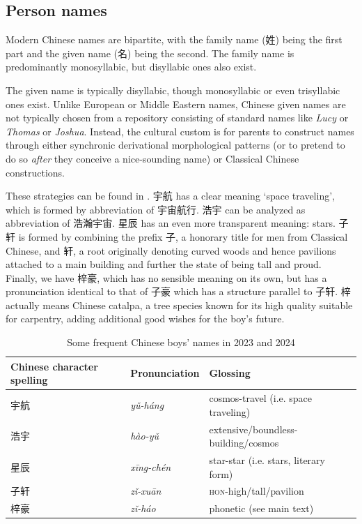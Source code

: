 \documentclass[UTF8, a4paper, oneside, scheme=plain, 12pt]{ctexrep}
\newcommand{\form}[1]{\emph{#1}}
\newcommand{\translate}[1]{`#1'}
\newcommand*{\category}[1]{\textsc{#1}}
\begin{document}
\subsection{Person names}

Modern Chinese names are bipartite, with the family name (姓) being the first part
and the given name (名) being the second.
The family name is predominantly monosyllabic,
but disyllabic ones also exist.

The given name is typically disyllabic,
though monosyllabic or even trisyllabic ones exist.
Unlike European or Middle Eastern names,
Chinese given names are not typically chosen from a repository consisting of standard names
like \form{Lucy} or \form{Thomas} or \form{Joshua}.
Instead, the cultural custom is for parents to construct names through
either synchronic derivational morphological patterns
(or to pretend to do so \emph{after} they conceive a nice-sounding name)
or Classical Chinese constructions.

These strategies can be found in .
宇航 has a clear meaning \translate{space traveling},
which is formed by abbreviation of 宇宙航行.
浩宇 can be analyzed as abbreviation of 浩瀚宇宙.
星辰 has an even more transparent meaning: stars.
子轩 is formed by combining the prefix 子, a honorary title for men from Classical Chinese,
and 轩, a root originally denoting curved woods and hence pavilions attached to a main building
and further the state of being tall and proud.
Finally, we have 梓豪, which has no sensible meaning on its own,
but has a pronunciation identical to that of 子豪
which has a structure parallel to 子轩.
梓 actually means Chinese catalpa, a tree species known for its high quality suitable for carpentry,
adding additional good wishes for the boy's future.

\begin{table}[H]
    \caption{Some frequent Chinese boys' names in 2023 and 2024}
    \label{tbl:boys-name}

    \centering
    \begin{tabular}{@{}lll@{}}
    \toprule
    Chinese character spelling & Pronunciation & Glossing \\ \midrule
    宇航    & \form{yǔ-háng} & cosmos-travel (i.e. space traveling) \\ 
    浩宇    & \form{hào-yǔ}  & extensive/boundless-building/cosmos    \\
    星辰    & \form{xīng-chén}         & star-star (i.e. stars, literary form)          \\ 
    子轩    & \form{zǐ-xuān} & \category{hon}-high/tall/pavilion \\
    梓豪    & \form{zǐ-háo}  & phonetic (see main text) \\ 
    \bottomrule
    \end{tabular}
\end{table}
\end{document}
